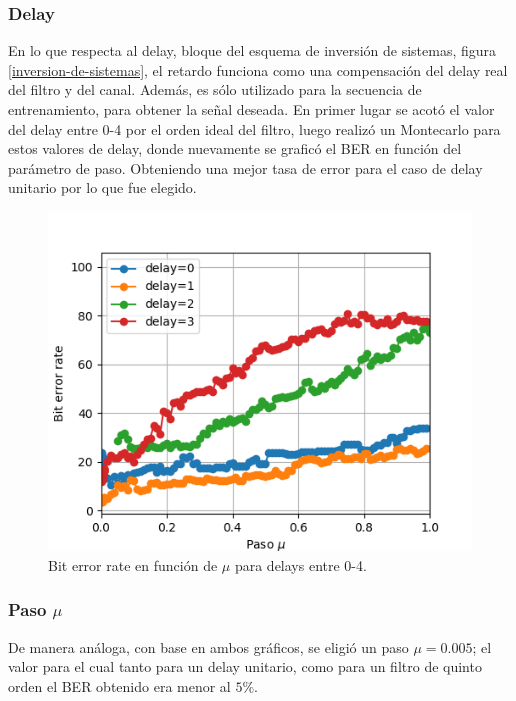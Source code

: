 \documentclass[main.tex]{subfiles}
\begin{document}
\subsubsection*{Delay}
En lo que respecta al delay, bloque del esquema de inversión de sistemas, 
figura \ref{inversion-de-sistemas}, el retardo funciona como una compensación del delay real
del filtro y del canal. Además, es sólo utilizado para la secuencia de entrenamiento, para obtener la señal deseada.
En primer lugar se acotó el valor del delay entre 0-4 por el orden ideal del filtro, 
luego realizó un Montecarlo para estos valores de delay, donde nuevamente se
graficó el BER en función del parámetro de paso. Obteniendo una mejor tasa de error 
para el caso de delay unitario por lo que fue elegido.
\begin{figure}[H]
    \centering
    \includegraphics[scale=0.6]{imagenes/delay.png}
    \caption{Bit error rate en función de $\mu$ para delays entre 0-4.}
\end{figure}

\subsubsection*{Paso $\mu$}
De manera análoga, con base en ambos gráficos, se eligió un paso $\mu=0.005$; el valor
para el cual tanto para un  delay unitario, como para un filtro de quinto orden
el BER obtenido era menor al $5\%$.
\end{document}

